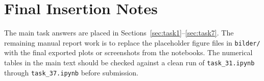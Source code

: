 \appendices
\section{Final Insertion Notes}
\label{sec:appendix}
The main task answers are placed in Sections~\ref{sec:task1}--\ref{sec:task7}. The remaining manual report work is to replace the placeholder figure files in \texttt{bilder/} with the final exported plots or screenshots from the notebooks. The numerical tables in the main text should be checked against a clean run of \texttt{task\_31.ipynb} through \texttt{task\_37.ipynb} before submission.
